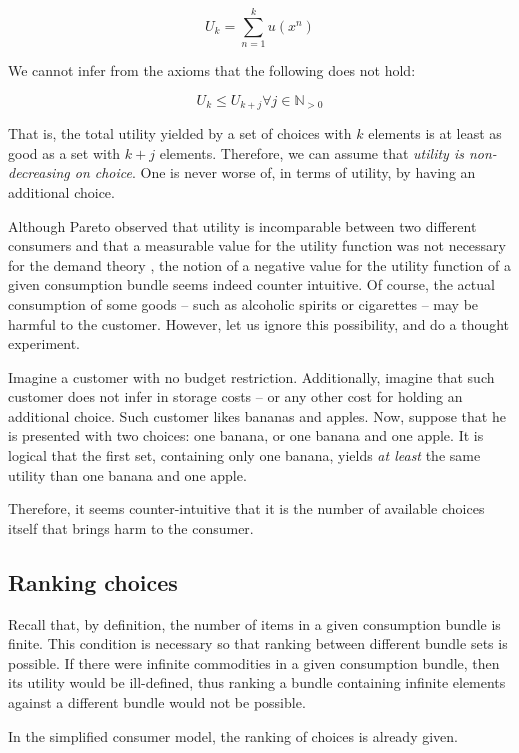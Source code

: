 \documentclass[12pt, letterpaper]{article}
\begin{document}
	\[ U_k = \sum_{n=1}^{k} u(x^n) \]
	
	We cannot infer from the axioms that the following does not hold:  
	
	\begin{equation}
		U_k \leq U_{k+j} \forall j \in \mathbb{N}_{> 0}
	\end{equation}

	That is, the total utility yielded by a set of choices with $k$ elements is at least as good as a set with $k+j$ elements. Therefore, we can assume that \textit{utility is non-decreasing on choice}. One is never worse of, in terms of utility, by having an additional choice. 

	Although Pareto observed that utility is incomparable between two different consumers and that a measurable value for the utility function was not necessary for the demand theory \cite{pareto1897}, the notion of a negative value for the utility function of a given consumption bundle seems indeed counter intuitive. Of course, the actual consumption of some goods -- such as alcoholic spirits or cigarettes -- may be harmful to the customer. However, let us ignore this possibility, and do a thought experiment. 
	
	Imagine a customer with no budget restriction. Additionally, imagine that such customer does not infer in storage costs -- or any other cost for holding an additional choice. Such customer likes bananas and apples. Now, suppose that he is presented with two choices: one banana, or one banana and one apple. It is logical that the first set, containing only one banana, yields \textit{at least} the same utility than one banana and one apple.
	
	Therefore, it seems counter-intuitive that it is the number of available choices itself that brings harm to the consumer.
	
	\subsection{Ranking choices}
	Recall that, by definition, the number of items in a given consumption bundle is finite. This condition is necessary so that ranking between different bundle sets is possible. If there were infinite commodities in a given consumption bundle, then its utility would be ill-defined, thus ranking a bundle containing infinite elements against a different bundle would not be possible.
	
	In the simplified consumer model, the ranking of choices is already given.




\end{document}
